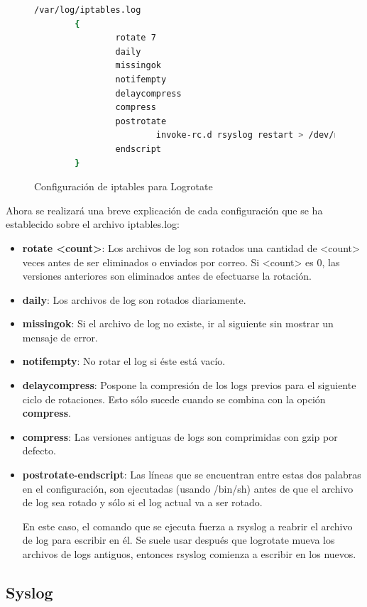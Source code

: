 \begin{figure}[H]
\begin{lstlisting}[language=bash]
/var/log/iptables.log
        {
                rotate 7
                daily
                missingok
                notifempty
                delaycompress
                compress
                postrotate
                        invoke-rc.d rsyslog restart > /dev/null
                endscript
        }
\end{lstlisting}
\caption{Configuración de iptables para Logrotate}
\end{figure}

Ahora se realizará una breve explicación de cada configuración que se ha establecido sobre el archivo iptables.log:

\begin{itemize}
\item \textbf{rotate <count>}: Los archivos de log son rotados una cantidad de <count> veces antes de ser eliminados o enviados por correo. Si <count> es 0, las versiones anteriores son eliminados antes de efectuarse la rotación.
\item \textbf{daily}: Los archivos de log son rotados diariamente.
\item \textbf{missingok}: Si el archivo de log no existe, ir al siguiente sin mostrar un mensaje de error.
\item \textbf{notifempty}: No rotar el log si éste está vacío.
\item \textbf{delaycompress}: Pospone la compresión de los logs previos para el siguiente ciclo de rotaciones. Esto sólo sucede cuando se combina con la opción \textbf{compress}.
\item \textbf{compress}: Las versiones antiguas de logs son comprimidas con gzip por defecto.
\item \textbf{postrotate-endscript}: Las líneas que se encuentran entre estas dos palabras en el configuración, son ejecutadas (usando /bin/sh) antes de que el archivo de log sea rotado y sólo si el log actual va a ser rotado.

  En este caso, el comando que se ejecuta fuerza a rsyslog a reabrir el archivo de log para escribir en él. Se suele usar después que logrotate mueva los archivos de logs antiguos, entonces rsyslog comienza a escribir en los nuevos.
\end{itemize}

\subsection{Syslog}

